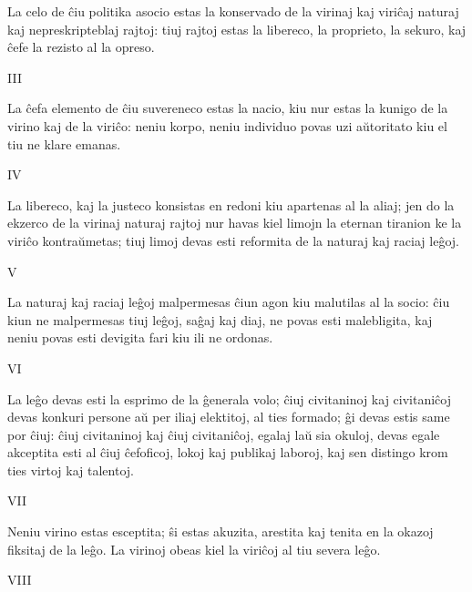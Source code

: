 \documentclass{book}
\begin{document}
La celo de ĉiu politika asocio estas la konservado de la virinaj kaj
viriĉaj naturaj kaj nepreskripteblaj rajtoj: tiuj rajtoj estas la libereco,
la proprieto, la sekuro, kaj ĉefe la rezisto al la opreso.

\vspace{1em}
\indent\indent\indent\indent III
\vspace{0.5em}

La ĉefa elemento de ĉiu suvereneco estas la nacio, kiu nur estas la kunigo
de la virino kaj de la viriĉo: neniu korpo, neniu individuo povas uzi
aŭtoritato kiu el tiu ne klare emanas.

\vspace{1em}
\indent\indent\indent\indent IV
\vspace{0.5em}

La libereco, kaj la justeco konsistas en redoni kiu apartenas al la aliaj;
jen do la ekzerco de la virinaj naturaj rajtoj nur havas kiel limojn la
eternan tiranion ke la viriĉo kontraŭmetas; tiuj limoj devas esti reformita
de la naturaj kaj raciaj leĝoj.

\vspace{1em}
\indent\indent\indent\indent V
\vspace{0.5em}

La naturaj kaj raciaj leĝoj malpermesas ĉiun agon kiu malutilas al la
socio: ĉiu kiun ne malpermesas tiuj leĝoj, saĝaj kaj diaj, ne povas esti
malebligita, kaj neniu povas esti devigita fari kiu ili ne ordonas.

\vspace{1em}
\indent\indent\indent\indent VI
\vspace{0.5em}

La leĝo devas esti la esprimo de la ĝenerala volo; ĉiuj civitaninoj kaj
civitaniĉoj devas konkuri persone aŭ per iliaj elektitoj, al ties formado;
ĝi devas estis same por ĉiuj: ĉiuj civitaninoj kaj ĉiuj civitaniĉoj, egalaj
laŭ sia okuloj, devas egale akceptita esti al ĉiuj ĉefoficoj, lokoj kaj
publikaj laboroj, kaj sen distingo krom ties virtoj kaj talentoj.

\vspace{1em}
\indent\indent\indent\indent VII
\vspace{0.5em}

Neniu virino estas esceptita; ŝi estas akuzita, arestita kaj tenita en
la okazoj fiksitaj de la leĝo. La virinoj obeas kiel la viriĉoj al tiu
severa leĝo.

\vspace{1em}
\indent\indent\indent\indent VIII
\vspace{0.5em}
\end{document}
